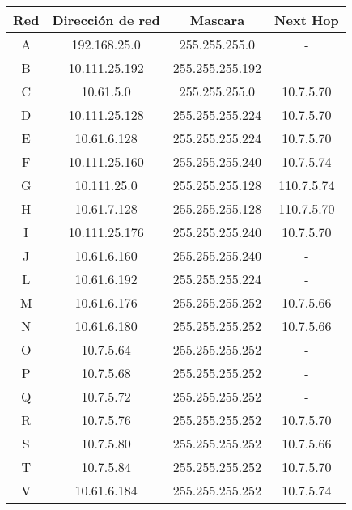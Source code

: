 \begin{table}[!htbp]
\centering
  \begin{tabular}{|c|c|c|c|}
  \hline
Red & Dirección de red & Mascara & Next Hop\\ \hline
A & 192.168.25.0 & 255.255.255.0 & -\\ \hline
B & 10.111.25.192 & 255.255.255.192 & -\\ \hline
C & 10.61.5.0 & 255.255.255.0 & 10.7.5.70 \\ \hline
D & 10.111.25.128 & 255.255.255.224 & 10.7.5.70 \\ \hline
E & 10.61.6.128 & 255.255.255.224 & 10.7.5.70 \\ \hline
F & 10.111.25.160 & 255.255.255.240 & 10.7.5.74 \\ \hline
G & 10.111.25.0 & 255.255.255.128 & 110.7.5.74 \\ \hline
H & 10.61.7.128 & 255.255.255.128 & 110.7.5.70 \\ \hline
I & 10.111.25.176 & 255.255.255.240 & 10.7.5.70	 \\ \hline
J & 10.61.6.160 & 255.255.255.240 & -\\ \hline
L & 10.61.6.192 & 255.255.255.224 & -\\ \hline
M & 10.61.6.176 & 255.255.255.252 &10.7.5.66 \\ \hline
N & 10.61.6.180 & 255.255.255.252 &10.7.5.66 \\ \hline
O & 10.7.5.64 & 255.255.255.252 & -\\ \hline
P & 10.7.5.68 & 255.255.255.252 & -\\ \hline
Q & 10.7.5.72 & 255.255.255.252 & -\\ \hline
R & 10.7.5.76 & 255.255.255.252 & 10.7.5.70 \\ \hline
S & 10.7.5.80 & 255.255.255.252 & 10.7.5.66 \\ \hline
T & 10.7.5.84 & 255.255.255.252 & 10.7.5.70 \\ \hline
V & 10.61.6.184 & 255.255.255.252 & 10.7.5.74 \\
  \hline
 \end{tabular}
\end{table}

\newpage
